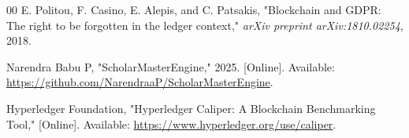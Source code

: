 \documentclass[conference]{IEEEtran}
\begin{document}
\begin{thebibliography}{00}
E. Politou, F. Casino, E. Alepis, and C. Patsakis, 
"Blockchain and GDPR: The right to be forgotten in the ledger context," 
\textit{arXiv preprint arXiv:1810.02254}, 2018.

Narendra Babu P, "ScholarMasterEngine," 2025. [Online]. Available: \url{https://github.com/NarendraaP/ScholarMasterEngine}.

Hyperledger Foundation,
"Hyperledger Caliper: A Blockchain Benchmarking Tool,"
[Online]. Available: \url{https://www.hyperledger.org/use/caliper}.


\end{thebibliography}
\end{document}
